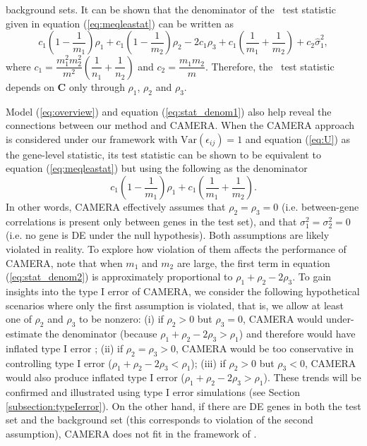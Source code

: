 	background sets. It can be shown that the denominator of the \OurMethod~test statistic given in 
	equation (\ref{eq:meqleastat}) can be written as
	\begin{equation}\label{eq:stat_denom1}
	c_1(1-\dfrac{1}{m_1})\rho_1 + c_1(1-\dfrac{1}{m_2})\rho_2 - 2c_1\rho_3 + 
	c_1(\dfrac{1}{m_1}+\dfrac{1}{m_2})+c_2\hat\sigma_1^2,
	\end{equation}
	where $c_1=\dfrac{m_1^2m_2^2}{m^2}(\dfrac{1}{n_1}+\dfrac{1}{n_2})$ and $c_2=\dfrac{m_1m_2}{m}$. 
	Therefore, the \OurMethod~test statistic depends on $\bm C$ only through $\rho_1$, $\rho_2$ and 
	$\rho_3$. 
	
	Model (\ref{eq:overview})  and equation (\ref{eq:stat_denom1}) also help reveal the 
	connections between our method and CAMERA. 
		When the CAMERA approach is considered under our framework with 
	$\mbox{Var}(\epsilon_{ij})=1$ and equation (\ref{eq:U}) as the gene-level statistic, its test 
	statistic can be shown to be equivalent to equation (\ref{eq:meqleastat}) but using the 
	following as the denominator
	\begin{equation}\label{eq:stat_denom2}
	c_1(1-\dfrac{1}{m_1})\rho_1 + c_1(\dfrac{1}{m_1}+\dfrac{1}{m_2}).
	\end{equation}
	In other words, CAMERA effectively assumes that $\rho_2=\rho_3=0$ (i.e. between-gene 
	correlations is present only between genes in the test set), and that $\sigma_1^2=\sigma_2^2=0$ 
	(i.e. no gene is DE under the null hypothesis). Both assumptions are likely violated in 
	reality. To explore how violation of them affects the performance of CAMERA, note that when 
	$m_1$ and $m_2$ are large, the first term in equation (\ref{eq:stat_denom2}) is approximately 
	proportional to $\rho_1+\rho_2-2\rho_3$. To gain insights into the type I error of CAMERA, we 
	consider the following hypothetical scenarios where only the first assumption is 
	violated, that is, we allow at least one of $\rho_2$ and $\rho_3$ to be nonzero: (i) if 
	$\rho_2>0$ but $\rho_3=0$, CAMERA would under-estimate the denominator (because 
	$\rho_1+\rho_2-2\rho_3 > \rho_1$) and therefore 
	would have inflated type I error ; (ii) if 
	$\rho_2=\rho_3>0$, CAMERA would be too conservative 
	in controlling type I error ($\rho_1+\rho_2-2\rho_3 < \rho_1$); (iii) if $\rho_2>0$ but 
	$\rho_3< 0$, CAMERA would also produce 
	inflated type I error ($\rho_1+\rho_2-2\rho_3 > \rho_1$). These trends will be confirmed and 
	illustrated using type I error simulations (see Section \ref{subsection:typeIerror}). On the 
	other hand, if there 
	are DE genes in both the test set and the background set (this corresponds to violation of the 
	second assumption), CAMERA does not fit in the framework of \OurMethod. 

